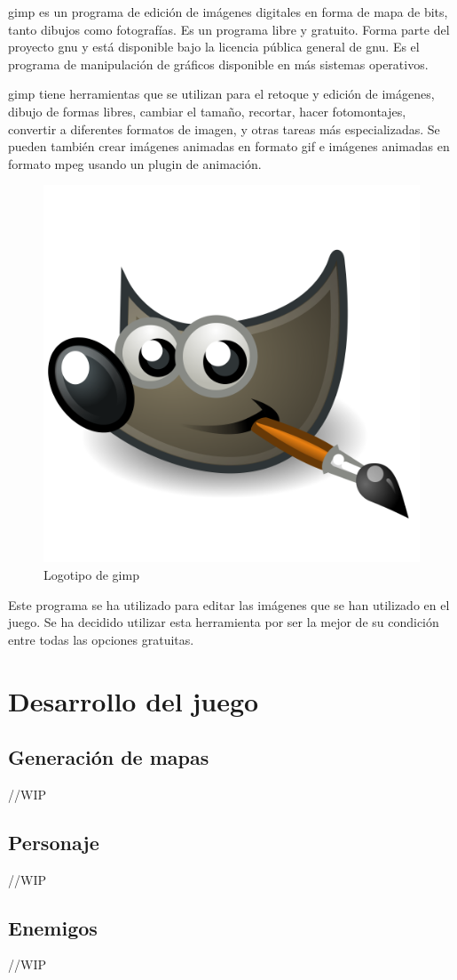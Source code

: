 		\acrfull{gimp} es un programa de edición de imágenes digitales en forma de mapa de bits, tanto dibujos como fotografías. Es un programa libre y gratuito. Forma parte del proyecto \acrshort{gnu} y está disponible bajo la licencia pública general de \acrshort{gnu}. Es el programa de manipulación de gráficos disponible en más sistemas operativos.

		\acrshort{gimp} tiene herramientas que se utilizan para el retoque y edición de imágenes, dibujo de formas libres, cambiar el tamaño, recortar, hacer fotomontajes, convertir a diferentes formatos de imagen, y otras tareas más especializadas. Se pueden también crear imágenes animadas en formato \acrshort{gif} e imágenes animadas en formato \acrshort{mpeg} usando un plugin de animación.

		\begin{figure}[!htp]
			 \centering
			 \includegraphics{fig/gimp}
			 \caption{Logotipo de \acrshort{gimp}}
			 \label{fig:gimp}
		\end{figure}

		Este programa se ha utilizado para editar las imágenes que se han utilizado en el juego. Se ha decidido utilizar esta herramienta por ser la mejor de su condición entre todas las opciones gratuitas.

\section{Desarrollo del juego}

	\subsection{Generación de mapas}

		//WIP

	\subsection{Personaje}

		//WIP

	\subsection{Enemigos}

		//WIP